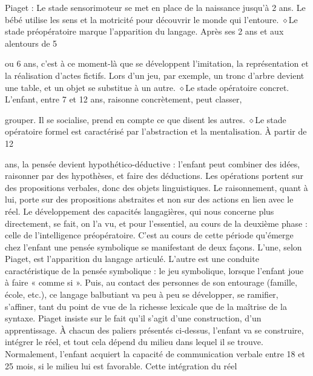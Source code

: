 Piaget :
Le stade sensorimoteur se met en place de la naissance jusqu'à 2 ans. Le bébé utilise les sens
et la motricité pour découvrir le monde qui l'entoure.
\noindent\textcolor{BellaTeal}{$\diamond$}\enspace Le stade préopératoire marque l'apparition du langage. Après ses 2 ans et aux alentours de 5\par
ou 6 ans, c'est à ce moment-là que se développent l'imitation, la représentation et la réalisation
d'actes fictifs. Lors d'un jeu, par exemple, un tronc d'arbre devient une table, et un objet se
substitue à un autre.
\noindent\textcolor{BellaTeal}{$\diamond$}\enspace Le stade opératoire concret. L'enfant, entre 7 et 12 ans, raisonne concrètement, peut classer,\par
grouper. Il se socialise, prend en compte ce que disent les autres.
\noindent\textcolor{BellaTeal}{$\diamond$}\enspace Le stade opératoire formel est caractérisé par l’abstraction et la mentalisation. À partir de 12\par
ans, la pensée devient hypothético-déductive : l'enfant peut combiner des idées, raisonner
par des hypothèses, et faire des déductions. Les opérations portent sur des propositions
verbales, donc des objets linguistiques. Le raisonnement, quant à lui, porte sur des propositions
abstraites et non sur des actions en lien avec le réel.
Le développement des capacités langagières, qui nous concerne plus directement, se fait, on
l'a vu, et pour l'essentiel, au cours de la deuxième phase : celle de l'intelligence préopératoire.
C'est au cours de cette période qu'émerge chez l'enfant une pensée symbolique se manifestant
de deux façons. L'une, selon Piaget, est l'apparition du langage articulé. L'autre est une conduite
caractéristique de la pensée symbolique : le jeu symbolique, lorsque l'enfant joue à faire « comme
si ». Puis, au contact des personnes de son entourage (famille, école, etc.), ce langage balbutiant va
peu à peu se développer, se ramifier, s'affiner, tant du point de vue de la richesse lexicale que de la
maîtrise de la syntaxe. Piaget insiste sur le fait qu'il s'agit d’une construction, d’un apprentissage.
À chacun des paliers présentés ci-dessus, l'enfant va se construire, intégrer le réel, et tout
cela dépend du milieu dans lequel il se trouve. Normalement, l'enfant acquiert la capacité de
communication verbale entre 18 et 25 mois, si le milieu lui est favorable. Cette intégration du réel
